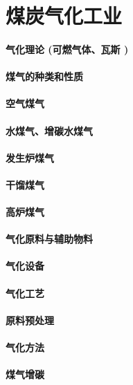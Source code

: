 \documentclass[UTF8]{../../ApplicationUniverse}
\begin{document}
\chapter{煤炭气化工业}
\subsubsection{气化理论 (可燃气体、瓦斯 )}
\subsubsection{煤气的种类和性质}
    \subsubsection{空气煤气}
    \subsubsection{水煤气、增碳水煤气}
    \subsubsection{发生炉煤气}
    \subsubsection{干馏煤气}
    \subsubsection{高炉煤气}
\subsubsection{气化原料与辅助物料}
\subsubsection{气化设备}
\subsubsection{气化工艺}
    \subsubsection{原料预处理}
    \subsubsection{气化方法}
    \subsubsection{煤气增碳}
\end{document}
